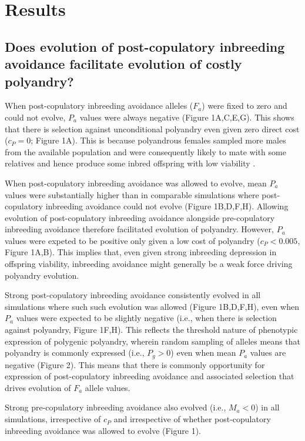 \documentclass[10pt,letterpaper]{article}
\begin{document}
\section*{Results}

\subsection*{Does evolution of post-copulatory inbreeding avoidance facilitate evolution of costly polyandry?}

When post-copulatory inbreeding avoidance alleles ($F_{a}$) were fixed to zero and could not evolve, $P_{a}$ values were always negative (Figure 1A,C,E,G). This shows that there is selection against unconditional polyandry even given zero direct cost ($c_{P}=0$; Figure 1A). This is because polyandrous females sampled more males from the available population and were consequently likely to mate with some relatives and hence produce some inbred offspring with low viability \cite[][]{Duthie}. 

When post-copulatory inbreeding avoidance was allowed to evolve, mean $P_{a}$ values were substantially higher than in comparable simulations where post-copulatory inbreeding avoidance could not evolve (Figure 1B,D,F,H). Allowing evolution of post-copulatory inbreeding avoidance alongside pre-copulatory inbreeding avoidance therefore facilitated evolution of polyandry. However, $P_{a}$ values were expeted to be positive only given a low cost of polyandry ($c_{P} < 0.005$, Figure 1A,B). This implies that, even given strong inbreeding depression in offspring viability, inbreeding avoidance might generally be a weak force driving polyandry evolution.

Strong post-copulatory inbreeding avoidance consistently evolved in all simulations where such such evolution was allowed (Figure 1B,D,F,H), even when $P_{a}$ values were expected to be slightly negative (i.e., when there is selection against polyandry, Figure 1F,H). This reflects the threshold nature of phenotypic expression of polygenic polyandry, wherein random sampling of alleles means that polyandry is commonly expressed (i.e., $P_{g}>0$) even when mean $P_{a}$ values are negative (Figure 2). This means that there is commonly opportunity for expression of post-copulatory inbreeding avoidance and associated selection that drives evolution of $F_{a}$ allele values.

Strong pre-copulatory inbreeding avoidance also evolved (i.e., $M_{a}<0$) in all simulations, irrespective of $c_{P}$ and irrespective of whether post-copulatory inbreeding avoidance was allowed to evolve (Figure 1).
\end{document}
